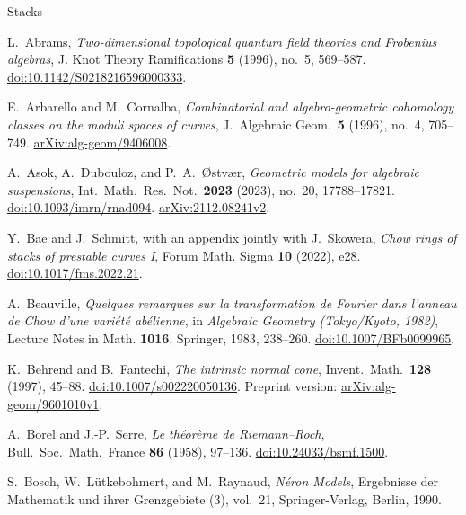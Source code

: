 \begin{thebibliography}{Stacks}

L.~Abrams,
\emph{Two-dimensional topological quantum field theories and Frobenius algebras},
J. Knot Theory Ramifications \textbf{5} (1996), no.~5, 569--587.
\href{https://doi.org/10.1142/S0218216596000333}{doi:10.1142/S0218216596000333}.

E.~Arbarello and M.~Cornalba,
\emph{Combinatorial and algebro-geometric cohomology classes on the moduli spaces of curves},
J.\ Algebraic Geom.\ \textbf{5} (1996), no.~4, 705--749.
\href{https://arxiv.org/abs/alg-geom/9406008}{arXiv:alg-geom/9406008}.

A.~Asok, A.~Dubouloz, and P.~A.~{\O}stv{\ae}r,
\emph{Geometric models for algebraic suspensions},
Int.\ Math.\ Res.\ Not.\ \textbf{2023} (2023), no.~20, 17788--17821.
\href{https://doi.org/10.1093/imrn/rnad094}{doi:10.1093/imrn/rnad094}.
\href{https://arxiv.org/abs/2112.08241v2}{arXiv:2112.08241v2}.

Y.~Bae and J.~Schmitt, with an appendix jointly with J.~Skowera,
\emph{Chow rings of stacks of prestable curves I},
Forum Math. Sigma \textbf{10} (2022), e28.
\href{https://doi.org/10.1017/fms.2022.21}{doi:10.1017/fms.2022.21}.

A.~Beauville,
\emph{Quelques remarques sur la transformation de Fourier dans l'anneau de Chow
d'une vari\'et\'e ab\'elienne},
in \emph{Algebraic Geometry (Tokyo/Kyoto, 1982)},
Lecture Notes in Math. \textbf{1016}, Springer, 1983, 238--260.
\href{https://doi.org/10.1007/BFb0099965}{doi:10.1007/BFb0099965}.

K.~Behrend and B.~Fantechi,
\emph{The intrinsic normal cone},
Invent.\ Math.\ \textbf{128} (1997), 45--88.
\href{https://doi.org/10.1007/s002220050136}{doi:10.1007/s002220050136}.
Preprint version:
\href{https://arxiv.org/abs/alg-geom/9601010v1}{arXiv:alg-geom/9601010v1}.

A.~Borel and J.-P.~Serre,
\emph{Le th\'eor\`eme de Riemann--Roch},
Bull.\ Soc.\ Math.\ France \textbf{86} (1958), 97--136.
\href{https://doi.org/10.24033/bsmf.1500}{doi:10.24033/bsmf.1500}.

S.~Bosch, W.~L\"utkebohmert, and M.~Raynaud,
\emph{N\'eron Models},
Ergebnisse der Mathematik und ihrer Grenzgebiete (3), vol.~21,
Springer-Verlag, Berlin, 1990.


\end{thebibliography}
